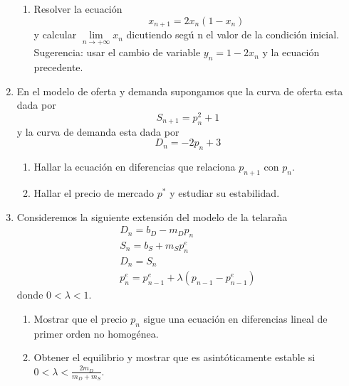 \documentclass{article}
\begin{document}
\begin{enumerate}
\begin{enumerate}
\item Resolver la ecuaci\'{o}n%
\begin{equation*}
x_{n+1}=2x_{n}\left( 1-x_{n}\right)
\end{equation*}%
y calcular $\underset{n\rightarrow +\infty }{\lim }x_{n}$ dicutiendo seg\'{u}%
n el valor de la condici\'{o}n inicial. Sugerencia: usar el cambio de
variable $y_{n}=1-2x_{n}$ y la ecuaci\'{o}n precedente.
\end{enumerate}

\item En el modelo de oferta y demanda supongamos que la curva de oferta
esta dada por%
\begin{equation*}
S_{n+1}=p_{n}^{2}+1
\end{equation*}%
y la curva de demanda esta dada por%
\begin{equation*}
D_{n}=-2p_{n}+3
\end{equation*}

\begin{enumerate}
\item Hallar la ecuaci\'{o}n en diferencias que relaciona $p_{n+1}$ con $%
p_{n}$.

\item Hallar el precio de mercado $p^{\ast }$ y estudiar su estabilidad.
\end{enumerate}

\item Consideremos la siguiente extensi\'{o}n del modelo de la telara\~{n}a 
\begin{equation*}
\begin{array}{c}
D_{n}=b_{D}-m_{D}p_{n} \\ 
S_{n}=b_{S}+m_{S}p_{n}^{e} \\ 
D_{n}=S_{n} \\ 
p_{n}^{e}=p_{n-1}^{e}+\lambda \left( p_{n-1}-p_{n-1}^{e}\right)%
\end{array}%
\end{equation*}%
donde $0<\lambda <1$.

\begin{enumerate}
\item Mostrar que el precio $p_{n}$ sigue una ecuaci\'{o}n en diferencias
lineal de primer orden no homog\'{e}nea.

\item Obtener el equilibrio y mostrar que es asint\'{o}ticamente estable si $%
0<\lambda <\frac{2m_{D}}{m_{D}+m_{S}}$.
\end{enumerate}


\end{enumerate}
\end{document}
